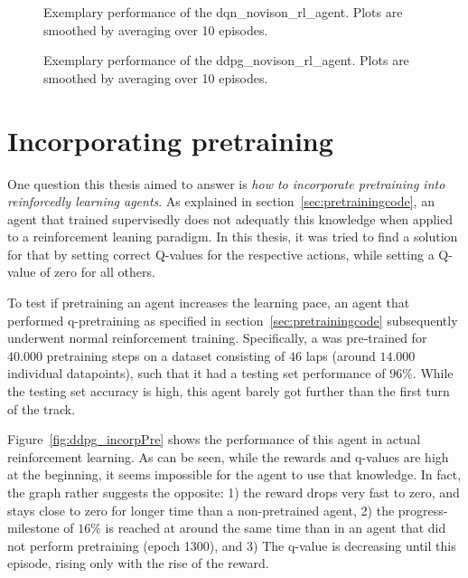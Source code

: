 \begin{figure}[h!]
		{%
			\setlength{\fboxsep}{0pt}%
			\setlength{\fboxrule}{1pt}%
		}%
	\centering
	\caption[Exemplary performance of the dqn\_novison\_rl\_agent]{Exemplary performance of the dqn\_novison\_rl\_agent. Plots are smoothed by averaging over 10 episodes.}
	\label{fig:dqn_result}
\end{figure}


\begin{figure}[h!]
{%
	\setlength{\fboxsep}{0pt}%
	\setlength{\fboxrule}{1pt}%
}%
\centering
\caption[Exemplary performance of the ddpg\_novison\_rl\_agent]{Exemplary performance of the ddpg\_novison\_rl\_agent. Plots are smoothed by averaging over 10 episodes.}
\label{fig:ddpg_result}
\end{figure}


\section{Incorporating pretraining}
\label{sec:incorporatePre}

One question this thesis aimed to answer is \textit{how to incorporate pretraining into reinforcedly learning agents}. As explained in section~\ref{sec:pretrainingcode}, an agent that trained supervisedly does not adequatly  this knowledge when applied to a reinforcement leaning paradigm. In this thesis, it was tried to find a solution for that by setting correct Q-values for the respective actions, while setting a Q-value of zero for all others.

To test if pretraining an agent increases the learning pace, an agent that performed q-pretraining as specified in section~\ref{sec:pretrainingcode} subsequently underwent normal reinforcement training. Specifically, a  was pre-trained for $40.000$ pretraining steps on a dataset consisting of $46$ laps (around $14.000$ individual datapoints), such that it had a testing set performance of $96\%$. While the testing set accuracy is high, this agent barely got further than the first turn of the track.

Figure~\ref{fig:ddpg_incorpPre} shows the performance of this agent in actual reinforcement learning. As can be seen, while the rewards and q-values are high at the beginning, it seems impossible for the agent to use that knowledge. In fact, the graph rather suggests the opposite: 1) the reward drops very fast to zero, and stays close to zero for longer time than a non-pretrained agent, 2) the progress-milestone of $16\%$ is reached at around the same time than in an agent that did not perform pretraining (epoch 1300), and 3) The q-value is decreasing until this episode, rising only with the rise of the reward.

